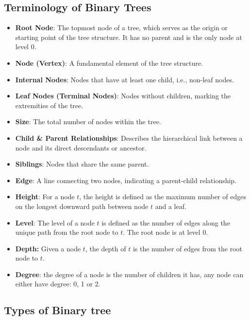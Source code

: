 \documentclass{report}
\begin{document}
\subsection{Terminology of Binary Trees}
\begin{itemize}
  \item \textbf{Root Node}: The topmost node of a tree, which serves as the origin or starting point of the tree structure. It has no parent and is the only node at level 0.
  \item \textbf{Node (Vertex)}: A fundamental element of the tree structure.
  \item \textbf{Internal Nodes}: Nodes that have at least one child, i.e., non-leaf nodes.
  \item \textbf{Leaf Nodes (Terminal Nodes)}: Nodes without children, marking the extremities of the tree.
  \item \textbf{Size}: The total number of nodes within the tree.
  \item \textbf{Child \& Parent Relationships}: Describes the hierarchical link between a node and its direct descendants or ancestor.
  \item \textbf{Siblings}: Nodes that share the same parent.
  \item \textbf{Edge}: A line connecting two nodes, indicating a parent-child relationship.
  \item \textbf{Height}: For a node \(t\), the height is defined as the maximum number of edges on the longest downward path between node \(t\) and a leaf.
  \item \textbf{Level}: The level of a node \(t\) is defined as the number of edges along the unique path from the root node to \(t\). The root node is at level 0.
  \item \textbf{Depth:} Given a node $t$, the depth of $t$ is the number of edges from the root node to $t$.
  \item \textbf{Degree}: the degree of a node is the number of children it has, any node can either have degree: 0, 1 or 2.
\end{itemize}
\subsection{Types of Binary tree} \vspace{2mm}
\end{document}
